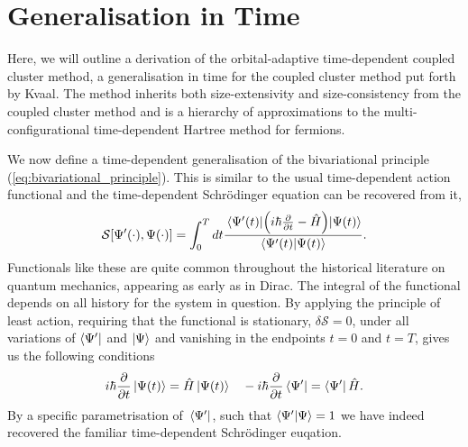 \section{Generalisation in Time}

Here, we will outline a derivation of the orbital-adaptive time-dependent coupled cluster 
method, a generalisation in time for the coupled cluster method put forth by 
Kvaal\cite{kvaal2012ab}. The method inherits both size-extensivity and size-consistency from 
the coupled cluster method and is a hierarchy of approximations to the multi-configurational 
time-dependent Hartree method for fermions.

We now define a time-dependent generalisation of the bivariational principle
(\autoref{eq:bivariational_principle}). This is similar to the usual time-dependent 
action functional and the time-dependent Schrödinger equation can be recovered from 
it,
\begin{equation}
    \label{eq:time_dependent_action_functional}
    \mathcal{S}[{\Psi}'(\cdot), \Psi(\cdot)]
        = \int_0^T dt \frac{\mel{{\Psi}'(t)}{\left(
            i\hbar \frac{\partial}{\partial t} - \hat{H}
        \right)}{\Psi(t)}}{\braket{{\Psi}'(t)}{\Psi(t)}}.
\end{equation}
Functionals like these are quite common throughout the historical literature on 
quantum mechanics, appearing as early as in Dirac\cite{dirac1930principles}. The 
integral of the functional depends on all history for the system in question. 
By applying the principle of least action, 
requiring that the functional is stationary, $\delta\mathcal{S} = 0$, under all variations 
of $\bra{{\Psi}'}$ and $\ket{\Psi}$ and vanishing in the endpoints $t=0$ and
$t=T$, gives us the following conditions
\begin{equation*}
    i\hbar\frac{\partial}{\partial t} \ket{\Psi(t)} = \hat{H}\ket{\Psi(t)}
    \quad -i \hbar \frac{\partial}{\partial t} \bra{{\Psi}'} = \bra{{\Psi}'}\hat{H}.
\end{equation*}
By a specific parametrisation of $\bra*{{\Psi}'}$, such that 
$\braket{{\Psi}'}{\Psi} = 1$ we have indeed recovered the familiar 
time-dependent Schrödinger euqation.


